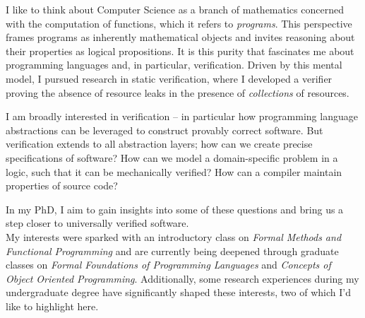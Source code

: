 \documentclass{article}
\begin{document}
I like to think about Computer Science as a branch of mathematics concerned with the computation of functions, which it refers to \emph{programs}. This perspective frames programs as inherently mathematical objects and invites reasoning about their properties as logical propositions. It is this purity that fascinates me about programming languages and, in particular, verification. Driven by this mental model, I pursued research in static verification, where I developed a verifier proving the absence of resource leaks in the presence of \emph{collections} of resources.

I am broadly interested in verification -- in particular how programming language abstractions can be leveraged to construct provably correct software. But verification extends to all abstraction layers; how can we create precise specifications of software? How can we model a domain-specific problem in a logic, such that it can be mechanically verified? How can a compiler maintain properties of source code?

In my PhD, I aim to gain insights into some of these questions and bring us a step closer to universally verified software.\\

My interests were sparked with an introductory class on \emph{Formal Methods and Functional Programming} and are currently being deepened through graduate classes on \emph{Formal Foundations of Programming Languages} and \emph{Concepts of Object Oriented Programming}. Additionally, some research experiences during my undergraduate degree have significantly shaped these interests, two of which I'd like to highlight here.\\
\end{document}

